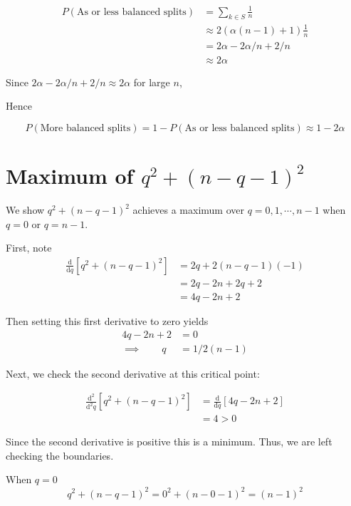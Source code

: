 \documentclass[paper=a4, fontsize=11pt]{scrartcl} %
\numberwithin{equation}{section} %
\numberwithin{figure}{section} %
\numberwithin{table}{section} %
\begin{document}
\begin{align*}
P(\textrm{As or less balanced splits}) &= \sum_{k \in S} \frac{1}{n}\\
							 &\approx 2(\alpha (n-1) + 1) \frac{1}{n}\\
							 &= 2 \alpha - 2\alpha/n + 2/n\\
							 &\approx 2 \alpha
\end{align*}

Since $2 \alpha - 2\alpha/n + 2/n \approx 2 \alpha$ for large $n$,

Hence

\[P(\textrm{More balanced splits}) = 1 - P(\textrm{As or less balanced splits}) \approx 1 - 2 \alpha\]

\section{Maximum of $q^2 + (n - q - 1)^2$}

We show $q^2 + (n - q - 1)^2$ achieves a maximum over $q = 0, 1, \cdots, n - 1$ when $q = 0$ or $q = n -1$.

First, note
\begin{align*}
\frac{\textrm{d}}{\textrm{d}q} [q^2 + (n - q - 1)^2] &= 2 q + 2 (n - q - 1)(-1) \\
	&= 2q - 2n + 2q +2\\
	&= 4q - 2n + 2
\end{align*}

Then setting this first derivative to zero yields
\begin{align*}
4q - 2n + 2 &= 0 \\
\implies \qquad{} q &= 1/2(n-1)
\end{align*}

Next, we check the second derivative at this critical point:

\begin{align*}
\frac{\textrm{d}^2}{\textrm{d}^2q} [q^2 + (n - q - 1)^2] &= \frac{\textrm{d}}{\textrm{d}q} [4q - 2n + 2] \\
	&= 4 > 0
\end{align*}

Since the second derivative is positive this is a minimum. Thus, we are left checking the boundaries.

When $q = 0$
\[q^2 + (n - q - 1)^2 = 0^2 + (n - 0 - 1)^2 = (n-1)^2\]
\end{document}
